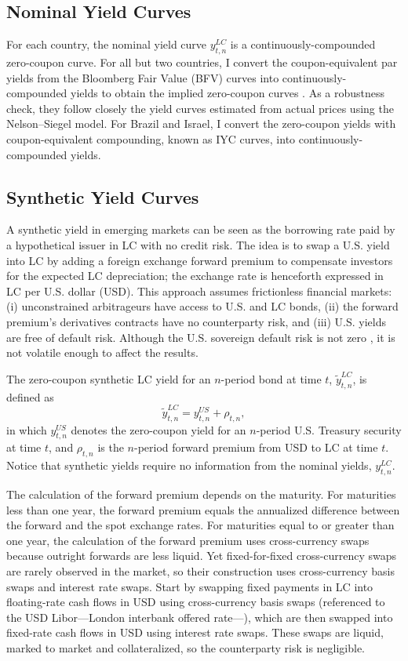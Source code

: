\documentclass[a4paper, 12pt]{article}
\providecommand{\tnr}{n}
\providecommand{\idxt}{t}
\providecommand{\idxs}{\idxt,\tnr}
\providecommand{\yld}{y}
\providecommand{\yLCnom}{\yld_{\idxs} ^{LC}}
\providecommand{\yLCsynt}{\widetilde{\yld}_{\idxs} ^{LC}}
\providecommand{\yUS}{y_{\idxs} ^{US}}
\providecommand{\fwdprm}{\rho_{\idxs}}
\newcommand{\eqyLCsynt}{\yLCsynt = \yUS + \fwdprm}
\begin{document}
\subsection{Nominal Yield Curves} \label{sec:YCnom}
For each country, the nominal yield curve \(\yLCnom\) is a continuously-compounded zero-coupon curve. For all but two countries, I convert the coupon-equivalent par yields from the Bloomberg Fair Value (BFV) curves into continuously-compounded yields to obtain the implied zero-coupon curves \citep[see][]{GSW:2007}. As a robustness check, they follow closely the yield curves estimated from actual prices using the Nelson--Siegel model. For Brazil and Israel, I convert the zero-coupon yields with coupon-equivalent compounding, known as IYC curves, into continuously-compounded yields. 

\subsection{Synthetic Yield Curves} \label{sec:YCsynt}
A synthetic yield in emerging markets can be seen as the borrowing rate paid by a hypothetical issuer in LC with no credit risk. The idea is to swap a U.S. yield into LC by adding a foreign exchange forward premium to compensate investors for the expected LC depreciation; the exchange rate is henceforth expressed in LC per U.S. dollar (USD). This approach assumes frictionless financial markets: (i) unconstrained arbitrageurs have access to U.S. and LC bonds, (ii) the forward premium's derivatives contracts have no counterparty risk, and (iii) U.S. yields are free of default risk. Although the U.S. sovereign default risk is not zero \citep{ACCS:2021}, it is not volatile enough to affect the results. 

The zero-coupon synthetic LC yield for an \(\tnr\)-period bond at time \(\idxt\), \(\yLCsynt\), is defined as
\begin{equation} \label{eq:nLCsynt}
\eqyLCsynt ,
\end{equation}
in which \(\yUS\) denotes the zero-coupon yield for an \(\tnr\)-period U.S. Treasury security at time \(\idxt\), and \(\fwdprm\) is the \(\tnr\)-period forward premium from USD to LC at time \(\idxt\). Notice that synthetic yields require no information from the nominal yields, \(\yLCnom\). 

The calculation of the forward premium depends on the maturity. For maturities less than one year, the forward premium equals the annualized difference between the forward and the spot exchange rates. For maturities equal to or greater than one year, the calculation of the forward premium uses cross-currency swaps because outright forwards are less liquid. Yet fixed-for-fixed cross-currency swaps are rarely observed in the market, so their construction uses cross-currency basis swaps and interest rate swaps. Start by swapping fixed payments in LC into floating-rate cash flows in USD using cross-currency basis swaps (referenced to the USD Libor---London interbank offered rate---), which are then swapped into fixed-rate cash flows in USD using interest rate swaps. These swaps are liquid, marked to market and collateralized, so the counterparty risk is negligible. 
\end{document}
